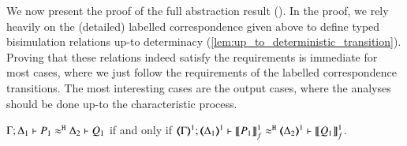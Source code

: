 \noindent We now present the proof of the full abstraction result ().
In the proof, we rely heavily on the (detailed) labelled correspondence given above to define 
typed bisimulation relations up-to determinacy (\ref{lem:up_to_deterministic_transition}). 
Proving that these relations indeed satisfy the requirements is immediate for most cases, where we just follow the requirements of the labelled correspondence transitions.
The most interesting cases are the output cases, where the analyses should be done up-to the characteristic process.


\begin{proposition}\rm
	\label{app:prop:fulla_HOp_to_HO}
	$\Gamma; \Delta_1 \vdash P_1 \approx^\mathtt{H} \Delta_2 \vdash Q_1$
	if and only if
	$\horel{\tmap{\Gamma}{1}}{\tmap{\Delta_1}{1}}{\pmapp{P_1}{1}{f}}{\hwb}{\tmap{\Delta_2}{1}}{\pmapp{Q_1}{1}{f}}$.
\end{proposition}


